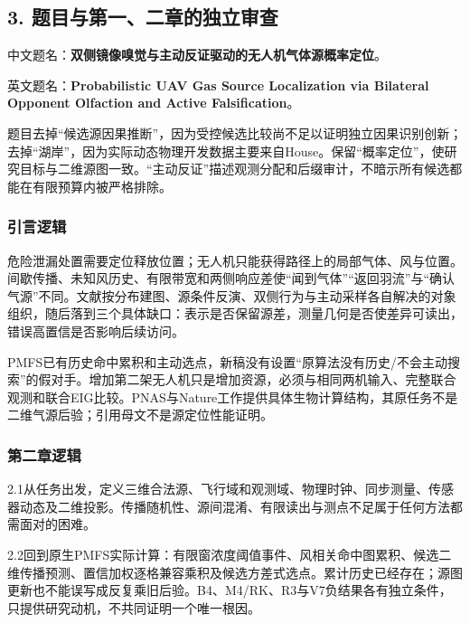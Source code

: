 \hypertarget{ux9898ux76eeux4e0eux7b2cux4e00ux4e8cux7ae0ux7684ux72ecux7acbux5ba1ux67e5}{%
\subsection{3.
题目与第一、二章的独立审查}\label{ux9898ux76eeux4e0eux7b2cux4e00ux4e8cux7ae0ux7684ux72ecux7acbux5ba1ux67e5}}

中文题名：\textbf{双侧镜像嗅觉与主动反证驱动的无人机气体源概率定位}。

英文题名：\textbf{Probabilistic UAV Gas Source Localization via
Bilateral Opponent Olfaction and Active Falsification}。

题目去掉``候选源因果推断''，因为受控候选比较尚不足以证明独立因果识别创新；去掉``湖岸''，因为实际动态物理开发数据主要来自House。保留``概率定位''，使研究目标与二维源图一致。``主动反证''描述观测分配和后缀审计，不暗示所有候选都能在有限预算内被严格排除。

\hypertarget{ux5f15ux8a00ux903bux8f91}{%
\subsubsection{引言逻辑}\label{ux5f15ux8a00ux903bux8f91}}

危险泄漏处置需要定位释放位置；无人机只能获得路径上的局部气体、风与位置。间歇传播、未知风历史、有限带宽和两侧响应差使``闻到气体''``返回羽流''与``确认气源''不同。文献按分布建图、源条件反演、双侧行为与主动采样各自解决的对象组织，随后落到三个具体缺口：表示是否保留源差，测量几何是否使差异可读出，错误高置信是否影响后续访问。

PMFS已有历史命中累积和主动选点，新稿没有设置``原算法没有历史/不会主动搜索''的假对手。增加第二架无人机只是增加资源，必须与相同两机输入、完整联合观测和联合EIG比较。PNAS与Nature工作提供具体生物计算结构，其原任务不是二维气源后验；引用母文不是源定位性能证明。

\hypertarget{ux7b2cux4e8cux7ae0ux903bux8f91}{%
\subsubsection{第二章逻辑}\label{ux7b2cux4e8cux7ae0ux903bux8f91}}

2.1从任务出发，定义三维合法源、飞行域和观测域、物理时钟、同步测量、传感器动态及二维投影。传播随机性、源间混淆、有限读出与测点不足属于任何方法都需面对的困难。

2.2回到原生PMFS实际计算：有限窗浓度阈值事件、风相关命中图累积、候选二维传播预测、置信加权逐格兼容乘积及候选方差式选点。累计历史已经存在；源图更新也不能误写成反复乘旧后验。B4、M4/RK、R3与V7负结果各有独立条件，只提供研究动机，不共同证明一个唯一根因。

